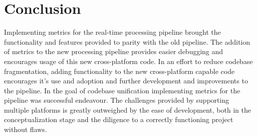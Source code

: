 \section{Conclusion}

Implementing metrics for the \gls{real-time} processing \gls{pipeline} brought
the functionality and features provided to parity with the old
\gls{pipeline}. The addition of metrics to the new processing \gls{pipeline}
provides easier debugging and encourages usage of this new cross-platform code.
In an effort to reduce codebase fragmentation, adding functionality to the new
cross-platform capable code encourages it's use and adoption and further
development and improvements to the pipeline. In the goal of codebase
unification implementing metrics for the pipeline was successful endeavour. The
challenges provided by supporting multiple platforms is greatly outweighed by
the ease of development, both in the conceptualization stage and the diligence
to a correctly functioning project without flaws.

